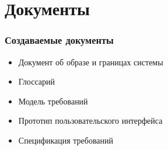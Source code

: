 \documentclass{../../slides-style}
\begin{document}
    \section{Документы}

    \begin{frame}
        \frametitle{Создаваемые документы}
        \begin{itemize}
            \item Документ об образе и границах системы
            \item Глоссарий
            \item Модель требований
            \item Прототип пользовательского интерфейса
            \item Спецификация требований
        \end{itemize}
    \end{frame}
\end{document}
